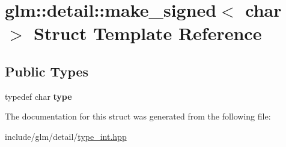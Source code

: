 \hypertarget{structglm_1_1detail_1_1make__signed_3_01char_01_4}{}\section{glm\+:\+:detail\+:\+:make\+\_\+signed$<$ char $>$ Struct Template Reference}
\label{structglm_1_1detail_1_1make__signed_3_01char_01_4}
\subsection*{Public Types}
\begin{DoxyCompactItemize}
\item 
\mbox{\label{structglm_1_1detail_1_1make__signed_3_01char_01_4_ad92111512e0af83393df0905896d478f}} 
typedef char {\bfseries type}
\end{DoxyCompactItemize}


The documentation for this struct was generated from the following file\+:\begin{DoxyCompactItemize}
\item 
include/glm/detail/\hyperlink{type__int_8hpp}{type\+\_\+int.\+hpp}\end{DoxyCompactItemize}
